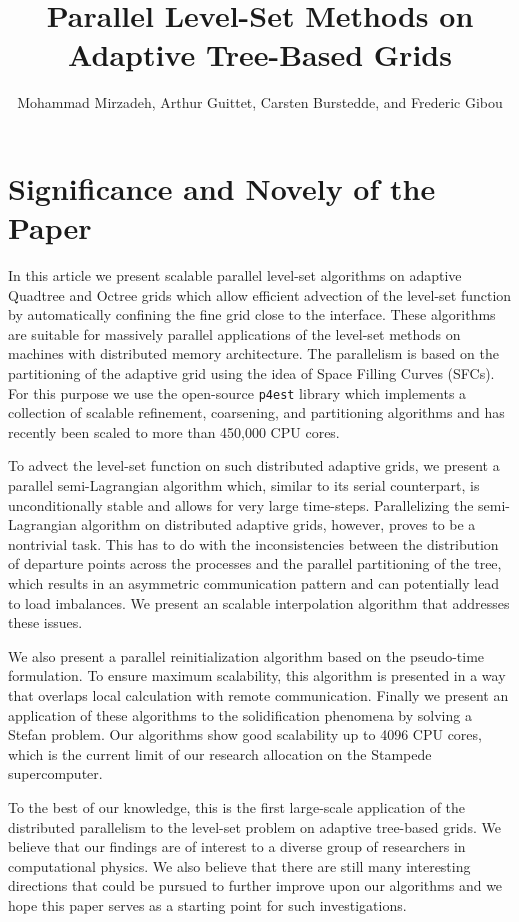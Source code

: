 \documentclass[11pt]{article}
\begin{document}
\title{Parallel Level-Set Methods on Adaptive Tree-Based Grids}

\author{Mohammad Mirzadeh, Arthur Guittet, Carsten Burstedde, and Frederic Gibou}
\maketitle
\section*{Significance and Novely of the Paper}
In this article we present scalable parallel level-set algorithms on adaptive Quadtree and Octree grids which allow efficient advection of the level-set function by automatically confining the fine grid close to the interface. These algorithms are suitable for massively parallel applications of the level-set methods on machines with distributed memory architecture. The parallelism is based on the partitioning of the adaptive grid using the idea of Space Filling Curves (SFCs). For this purpose we use the open-source \texttt{p4est} library which implements a collection of scalable refinement, coarsening, and partitioning algorithms and has recently been scaled to more than 450,000 CPU cores.

To advect the level-set function on such distributed adaptive grids, we present a parallel semi-Lagrangian algorithm which, similar to its serial counterpart, is unconditionally stable and allows for very large time-steps. Parallelizing the semi-Lagrangian algorithm on distributed adaptive grids, however, proves to be a nontrivial task. This has to do with the inconsistencies between the distribution of departure points across the processes and the parallel partitioning of the tree, which results in an asymmetric communication pattern and can potentially lead to load imbalances. We present an scalable interpolation algorithm that addresses these issues.

We also present a parallel reinitialization algorithm based on the pseudo-time formulation. To ensure maximum scalability, this algorithm is presented in a way that overlaps local calculation with remote communication. Finally we present an application of these algorithms to the solidification phenomena by solving a Stefan problem. Our algorithms show good scalability up to 4096 CPU cores, which is the current limit of our research allocation on the Stampede supercomputer. 

To the best of our knowledge, this is the first large-scale application of the distributed parallelism to the level-set problem on adaptive tree-based grids. We believe that our findings are of interest to a diverse group of researchers in computational physics. We also believe that there are still many interesting directions that could be pursued to further improve upon our algorithms and we hope this paper serves as a starting point for such investigations.
\end{document}
